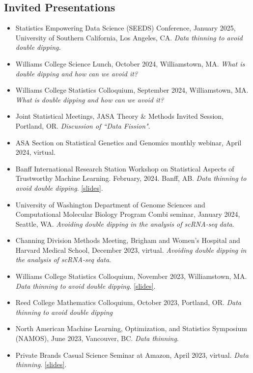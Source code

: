 \documentclass[margin, 10pt]{res}
\begin{document}
\begin{resume}
\section{Invited Presentations} 
\begin{itemize}
\item Statistics Empowering Data Science (SEEDS) Conference, January 2025, University of Southern California, Los Angeles, CA. \emph{Data thinning to avoid double dipping.} 
\item Williams College Science Lunch, October 2024, Williamstown, MA. \emph{What is double dipping and how can we avoid it?}
\item Williams College Statistics Colloquium, September 2024, Williamstown, MA. \emph{What is double dipping and how can we avoid it?}
\item Joint Statistical Meetings, JASA Theory \& Methods Invited Session, Portland, OR. \emph{Discussion of ``Data Fission"}. 
\item ASA Section on Statistical Genetics and Genomics monthly webinar, April 2024, virtual. \item Banff International Research Station Workshop on Statistical Aspects of Trustworthy Machine Learning. February, 2024. Banff, AB. \emph{Data thinning to avoid double dipping}. \href{https://anna-neufeld.github.io/slides/BIRS.pdf}{[slides]}. 
\item University of Washington Department of Genome Sciences and Computational Molecular Biology Program Combi seminar, January 2024, Seattle, WA. \emph{Avoiding double dipping in the analysis of scRNA-seq data}.
\item Channing Division Methods Meeting, Brigham and Women's Hospital and Harvard Medical School, December 2023, virtual. \emph{Avoiding double dipping in the analysis of scRNA-seq data}.
\item Williams College Statistics Colloquium, November 2023, Williamstown, MA. \emph{Data thinning to avoid double dipping}. \href{https://anna-neufeld.github.io/slides/jobtalk.pdf}{[slides]}.
\item Reed College Mathematics Colloquium, October 2023, Portland, OR. \emph{Data thinning to avoid double dipping}
\item North American Machine Learning, Optimization, and Statistics Symposium (NAMOS), June 2023, Vancouver, BC. \emph{Data thinning}. 
\item Private Brands Casual Science Seminar at Amazon, April 2023, virtual. \emph{Data thinning}. \href{https://anna-neufeld.github.io/slides/amazon.pdf}{[slides]}. 

\end{itemize}
\end{resume}
\end{document}
